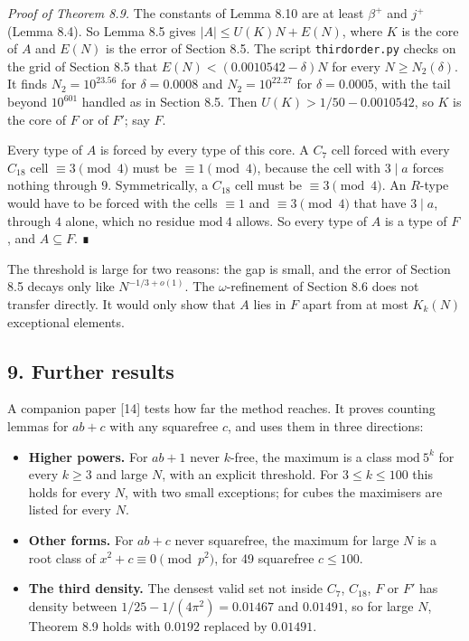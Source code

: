 \documentclass[
  11pt,
]{article}
\providecommand{\tightlist}{%
  \setlength{\itemsep}{0pt}\setlength{\parskip}{0pt}}
\begin{document}
\emph{Proof of Theorem 8.9.} The constants of Lemma 8.10 are at least
\(\beta^{+}\) and \(j^{+}\) (Lemma 8.4). So Lemma 8.5 gives
\(|A| \le U(K)N + E(N)\), where \(K\) is the core of \(A\) and \(E(N)\)
is the error of Section 8.5. The script \texttt{thirdorder.py} checks on
the grid of Section 8.5 that \(E(N) < (0.0010542 - \delta)N\) for every
\(N \ge N_2(\delta)\). It finds \(N_2 = 10^{23.56}\) for
\(\delta = 0.0008\) and \(N_2 = 10^{22.27}\) for \(\delta = 0.0005\),
with the tail beyond \(10^{601}\) handled as in Section 8.5. Then
\(U(K) > 1/50 - 0.0010542\), so \(K\) is the core of \(F\) or of \(F'\);
say \(F\).

Every type of \(A\) is forced by every type of this core. A \(C_7\) cell
forced with every \(C_{18}\) cell \(\equiv 3 \pmod{4}\) must be
\(\equiv 1 \pmod{4}\), because the cell with \(3 \mid a\) forces nothing
through \(9\). Symmetrically, a \(C_{18}\) cell must be
\(\equiv 3 \pmod{4}\). An \(R\)-type would have to be forced with the
cells \(\equiv 1\) and \(\equiv 3 \pmod{4}\) that have \(3 \mid a\),
through \(4\) alone, which no residue \(\mathrm{mod}\ 4\) allows. So
every type of \(A\) is a type of \(F\), and \(A \subseteq F\). ∎

The threshold is large for two reasons: the gap is small, and the error
of Section 8.5 decays only like \(N^{-1/3+o(1)}\). The
\(\omega\)-refinement of Section 8.6 does not transfer directly. It
would only show that \(A\) lies in \(F\) apart from at most \(K_k(N)\)
exceptional elements.

\subsection{9. Further results}

A companion paper {[}14{]} tests how far the method reaches. It proves
counting lemmas for \(ab + c\) with any squarefree \(c\), and uses them
in three directions:

\begin{itemize}
\tightlist
\item
  \textbf{Higher powers.} For \(ab + 1\) never \(k\)-free, the maximum
  is a class \(\mathrm{mod}\ 5^k\) for every \(k \ge 3\) and large
  \(N\), with an explicit threshold. For \(3 \le k \le 100\) this holds
  for every \(N\), with two small exceptions; for cubes the maximisers
  are listed for every \(N\).
\item
  \textbf{Other forms.} For \(ab + c\) never squarefree, the maximum for
  large \(N\) is a root class of \(x^2 + c \equiv 0 \pmod{p^2}\), for 49
  squarefree \(c \le 100\).
\item
  \textbf{The third density.} The densest valid set not inside \(C_7\),
  \(C_{18}\), \(F\) or \(F'\) has density between
  \(1/25 - 1/(4\pi^2) = 0.01467\) and \(0.01491\), so for large \(N\),
  Theorem 8.9 holds with \(0.0192\) replaced by \(0.01491\).
\end{itemize}
\end{document}
